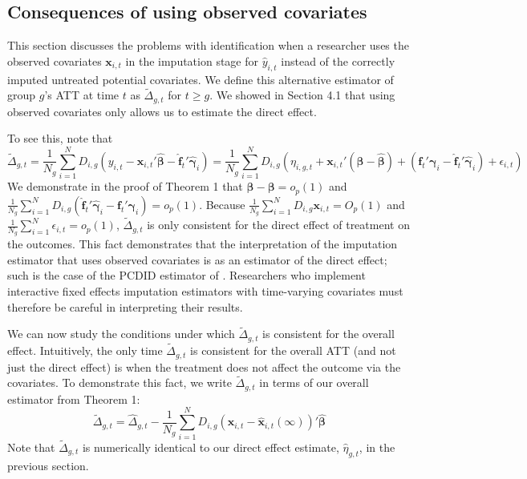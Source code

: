 \documentclass[12pt,fleqn]{article}
\def\*#1{\mathbf{#1}}
\def\+#1{\boldsymbol{#1}}
\begin{document}
\subsection{Consequences of using observed covariates}\label{sec:post_treatment_bias}

This section discusses the problems with identification when a researcher uses the observed covariates $\*x_{i,t}$ in the imputation stage for $\widehat{y}_{i,t}$ instead of the correctly imputed untreated potential covariates. We define this alternative estimator of group $g$'s ATT at time $t$ as $\tilde{\Delta}_{g,t}$ for $t \geq g$. We showed in Section 4.1 that using observed covariates only allows us to estimate the direct effect. 

To see this, note that
\begin{equation}
    \tilde{\Delta}_{g,t} = \frac{1}{N_g} \sum_{i = 1}^N D_{i,g} \left( y_{i,t} - \*x_{i,t}' \widehat{\+\beta} - \widehat{\*f}_t' \widehat{\+\gamma}_i \right) = \frac{1}{N_g} \sum_{i = 1}^N D_{i,g} \left( \eta_{i,g,t} + \*x_{i,t}' (\+\beta - \widehat{\+\beta}) + \left( \*f_t' \+\gamma_i - \widehat{\*f}_t' \widehat{\+\gamma}_i \right) + \epsilon_{i,t} \right)
\end{equation}
We demonstrate in the proof of Theorem 1 that $\widehat{\+\beta} - \+\beta = o_p(1)$ and $\frac{1}{N_g} \sum_{i = 1}^N D_{i,g} \left( \widehat{\*f}_t' \widehat{\+\gamma}_i - \*f_t' \+\gamma_i \right) = o_p(1)$. Because $\frac{1}{N_g} \sum_{i = 1}^N D_{i,g} \*x_{i,t} = O_p(1)$ and $\frac{1}{N_g} \sum_{i = 1}^N \epsilon_{i,t} = o_p(1)$, $\tilde{\Delta}_{g,t}$ is only consistent for the direct effect of treatment on the outcomes. This fact demonstrates that the interpretation of the imputation estimator that uses observed covariates is as an estimator of the direct effect; such is the case of the PCDID estimator of \citet{chan2022pcdid}. Researchers who implement interactive fixed effects imputation estimators with time-varying covariates must therefore be careful in interpreting their results.

We can now study the conditions under which $\tilde{\Delta}_{g,t}$ is consistent for the overall effect. Intuitively, the only time $\tilde{\Delta}_{g,t}$ is consistent for the overall ATT (and not just the direct effect) is when the treatment does not affect the outcome via the covariates. To demonstrate this fact, we write $\tilde{\Delta}_{g,t}$ in terms of our overall estimator from Theorem 1:
\begin{equation}\label{delta tilde and delta hat}
    \tilde{\Delta}_{g,t} = \widehat{\Delta}_{g,t} - \frac{1}{N_g} \sum_{i = 1}^N D_{i,g} (\*x_{i,t} - \widehat{\*x}_{i,t}(\infty))' \widehat{\+\beta}
\end{equation}
Note that $\tilde{\Delta}_{g,t}$ is numerically identical to our direct effect estimate, $\widehat{\eta}_{g,t}$, in the previous section. 
\end{document}

